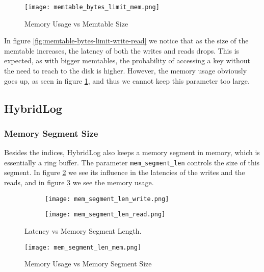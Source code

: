 \begin{figure}[h]
    \centering
    \texttt{[image: memtable\_bytes\_limit\_mem.png]}
    \caption{Memory Usage vs Memtable Size}
    \label{fig:memtable_bytes_limit_mem}
\end{figure}

In figure \ref{fig:memtable-bytes-limit-write-read} we notice that as the size of the memtable increases, the latency of both the writes and reads drops. This is expected, as with bigger memtables, the probability of accessing a key without the need to reach to the disk is higher. However, the memory usage obviously goes up, as seen in figure \ref{fig:memtable_bytes_limit_mem}, and thus we cannot keep this parameter too large.

\subsection{HybridLog}

\subsubsection{Memory Segment Size}

Besides the indices, HybridLog also keeps a memory segment in memory, which is essentially a ring buffer. The parameter \verb"mem_segment_len" controls the size of this segment. In figure \ref{fig:mem_segment_len_write_read} we see its influence in the latencies of the writes and the reads, and in figure \ref{fig:mem_segment_len_mem.png} we see the memory usage.

\begin{figure}[h]
    \begin{subfigure}{.5\textwidth}
        \centering
        \texttt{[image: mem\_segment\_len\_write.png]}
    \end{subfigure}
    \begin{subfigure}{.5\textwidth}
        \centering
        \texttt{[image: mem\_segment\_len\_read.png]}
    \end{subfigure}
    \caption{Latency vs Memory Segment Length.}
    \label{fig:mem_segment_len_write_read}
\end{figure}


\begin{figure}[h]
    \centering
    \texttt{[image: mem\_segment\_len\_mem.png]}
    \caption{Memory Usage vs Memory Segment Size}
    \label{fig:mem_segment_len_mem.png}
\end{figure}

